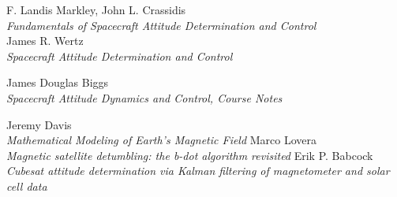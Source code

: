 \documentclass[11pt,a4paper]{report}
\begin{document}



\tableofcontents{}

\clearpage{}

\setcounter{page}{3}

\glsaddall
\glsdisablehyper
\printnoidxglossary[type=\acronymtype,title=Abbreviated Terms]

\nocite{*}
\renewcommand\bibname{Reference Books}
\begin{thebibliography}{0}
    F. Landis Markley, John L. Crassidis \\
    \textit{Fundamentals of Spacecraft Attitude Determination and Control} \\ 
    James R. Wertz \\
    \textit{Spacecraft Attitude Determination and Control}      \\
\end{thebibliography}

\renewcommand\bibname{Reference Notes}
\begin{thebibliography}{0}
\setcounter{enumiv}{2}
    James Douglas Biggs \\
    \textit{Spacecraft Attitude Dynamics and Control, Course Notes}  
\end{thebibliography}

\renewcommand\bibname{Reference Articles}
\begin{thebibliography}{0}
\setcounter{enumiv}{3}
    Jeremy Davis\\
    \textit{Mathematical Modeling of Earth’s Magnetic Field}
    Marco Lovera\\    
    \textit{Magnetic satellite detumbling: the b-dot algorithm revisited}
    Erik P. Babcock\\    
    \textit{Cubesat attitude determination via Kalman filtering of magnetometer and solar cell data}
\end{thebibliography}
\end{document}
